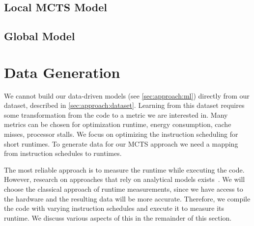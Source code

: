 \subsection{Local MCTS Model}
\label{subsec:approach:ml:mcts}
\subsection{Global Model}
\label{subsec:approach:ml:global}

\section{Data Generation}
\tobechecked
We cannot build our data-driven models (see \cref{sec:approach:ml}) directly from our dataset, described in \cref{sec:approach:dataset}.
Learning from this dataset requires some transformation from the code to a metric we are interested in.
Many metrics can be chosen for optimization \eg runtime, energy consumption, cache misses, processor stalls.
We focus on optimizing the instruction scheduling for short runtimes.
To generate data for our MCTS approach we need a mapping from instruction schedules to runtimes.

The most reliable approach is to measure the runtime while executing the code.
However, research on approaches that rely on analytical models exists~\cite{llvm:mca, mendis2019ithemal, taha2003instruction, laukemann2018automated}.
We will choose the classical approach of runtime measurements, since we have access to the hardware and the resulting data will be more accurate.
Therefore, we compile the code with varying instruction schedules and execute it to measure its runtime.
We discuss various aspects of this in the remainder of this section.

